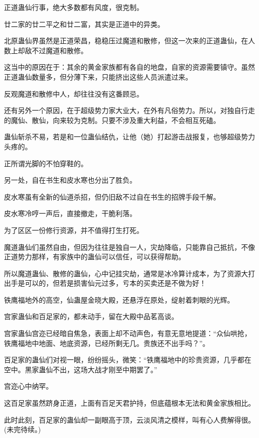 \begin{this_body}
正道蛊仙行事，绝大多数都有风度，很克制。

廿二家的廿二平之和廿二富，其实是正道中的异类。

北原蛊仙界虽然是正道荣昌，稳稳压过魔道和散修，但这一次来的正道蛊仙，在人数上却敌不过魔道和散修。

这当中的原因在于：其余的黄金家族都有各自的地盘，自家的资源需要镇守。虽然正道蛊仙数量多，但分薄下来，只能挤出这些人员派遣过来。

反观魔道和散修中人，却往往没有这番顾忌。

还有另外一个原因，在于超级势力家大业大，在外有凡俗势力。所以，对独自行走的魔仙、散仙，向来较为克制。只要不涉及重大利益，不会相互死磕。

蛊仙斩杀不易，若是和一位蛊仙结仇，让他（她）打起游击战报复，也够超级势力头疼的。

正所谓光脚的不怕穿鞋的。

另一处，自在书生和皮水寒也分出了胜负。

皮水寒虽有全新的仙道杀招，但仍旧敌不过自在书生的招牌手段千解。

皮水寒冷哼一声后，直接撤走，干脆利落。

为了区区一份修行资源，并不值得打生打死。

魔道蛊仙们虽然自由，但因为往往是独自一人，灾劫降临，只能靠自己抵抗，不像正道势力那样，有家族中的蛊仙可以信任，可以获得帮助。

所以魔道蛊仙、散修的蛊仙，心中记挂灾劫，通常是冰冷算计成本，为了资源大打出手是可以的，但若是损害仙元过多，亏本的买卖还是不做为好！

铁鹰福地外的高空，仙蛊屋金晓大殿，还悬浮在原处，绽射着刺眼的光辉。

宫家蛊仙和百足家的，都未动手，留在大殿中品茗高谈。

宫家蛊仙宫迩已经暗自焦急，表面上却不动声色，有意无意地提道：“众仙哄抢，铁鹰福地中地面、地底资源，已经所剩无几。贵族还不出手吗？”。

百足家的蛊仙们对视一眼，纷纷摇头，微笑：“铁鹰福地中的珍贵资源，几乎都在空中。黑家蛊仙不出，这场大战才刚至中期罢了。”

宫迩心中纳罕。

这百足家虽然跻身正道，上面有百足天君护持，但底蕴根本无法和黄金家族相比。

此时此刻，百足家的蛊仙却一副眼高于顶，云淡风清之模样，叫有心人费解得很。(未完待续。)

\end{this_body}

